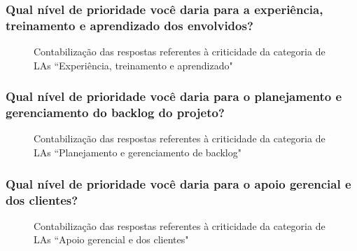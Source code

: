 \subsubsection{Qual nível de prioridade você daria para a experiência, treinamento e aprendizado dos envolvidos?}

\begin{figure}[H]
	\centering
	\captionsetup{justification=centering,margin=2cm}
	\caption{Contabilização das respostas referentes à criticidade da categoria de LAs ``Experiência, treinamento e aprendizado"}
	\label{fig:result-exp}
\end{figure}


\subsubsection{Qual nível de prioridade você daria para o planejamento e gerenciamento do backlog do projeto?}

\begin{figure}[H]
	\centering
	\captionsetup{justification=centering,margin=2cm}
	\caption{Contabilização das respostas referentes à criticidade da categoria de LAs ``Planejamento e gerenciamento de backlog"}
	\label{fig:result-backlog}
\end{figure}

\subsubsection{Qual nível de prioridade você daria para o apoio gerencial e dos clientes?}

\begin{figure}[H]
	\centering
	\captionsetup{justification=centering,margin=2cm}
	\caption{Contabilização das respostas referentes à criticidade da categoria de LAs ``Apoio gerencial e dos clientes"}
	\label{fig:result-apoio}
\end{figure}

